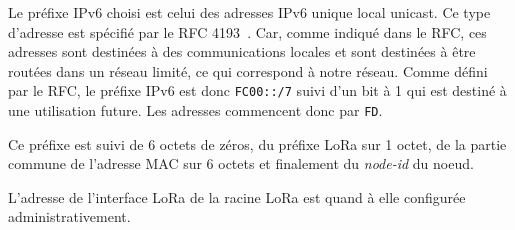     Le préfixe IPv6 choisi est celui des adresses IPv6 unique local unicast. Ce type d'adresse est spécifié par le RFC 4193~\cite{rfc4193}. Car, comme indiqué dans le RFC, ces adresses sont destinées à des communications locales et sont destinées à être routées dans un réseau limité, ce qui correspond à notre réseau. Comme défini par le RFC, le préfixe IPv6 est donc \texttt{FC00::/7} suivi d'un bit à 1 qui est destiné à une utilisation future. Les adresses commencent donc par \texttt{FD}.

    Ce préfixe est suivi de 6 octets de zéros, du préfixe LoRa sur 1 octet, de la partie commune de l'adresse MAC sur 6 octets et finalement du \textit{node-id} du noeud.

    L'adresse de l'interface LoRa de la racine LoRa est quand à elle configurée administrativement.